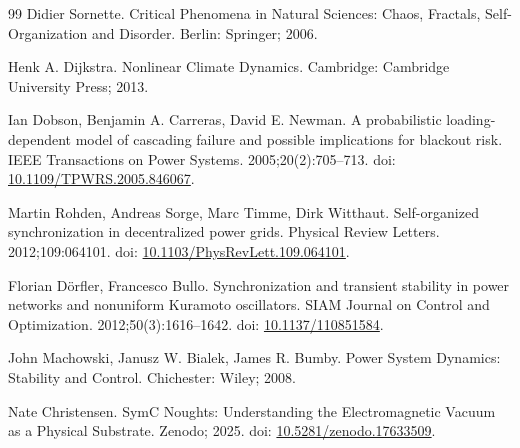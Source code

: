 \documentclass[11pt,letterpaper]{article}
\begin{document}
\begin{thebibliography}{99}
\bibitem{} Didier Sornette. Critical Phenomena in Natural Sciences: Chaos, Fractals, Self-Organization and Disorder. Berlin: Springer; 2006.

\bibitem{} Henk A. Dijkstra. Nonlinear Climate Dynamics. Cambridge: Cambridge University Press; 2013.

\bibitem{} Ian Dobson, Benjamin A. Carreras, David E. Newman. A probabilistic loading-dependent model of cascading failure and possible implications for blackout risk. IEEE Transactions on Power Systems. 2005;20(2):705--713. doi: \href{https://doi.org/10.1109/TPWRS.2005.846067}{10.1109/TPWRS.2005.846067}.

\bibitem{} Martin Rohden, Andreas Sorge, Marc Timme, Dirk Witthaut. Self-organized synchronization in decentralized power grids. Physical Review Letters. 2012;109:064101. doi: \href{https://doi.org/10.1103/PhysRevLett.109.064101}{10.1103/PhysRevLett.109.064101}.

\bibitem{} Florian Dörfler, Francesco Bullo. Synchronization and transient stability in power networks and nonuniform Kuramoto oscillators. SIAM Journal on Control and Optimization. 2012;50(3):1616--1642. doi: \href{https://doi.org/10.1137/110851584}{10.1137/110851584}.

\bibitem{} John Machowski, Janusz W. Bialek, James R. Bumby. Power System Dynamics: Stability and Control. Chichester: Wiley; 2008.

\bibitem{} Nate Christensen. SymC Noughts: Understanding the Electromagnetic Vacuum as a Physical Substrate. Zenodo; 2025. doi: \href{https://doi.org/10.5281/zenodo.17633509}{10.5281/zenodo.17633509}.

\end{thebibliography}
\end{document}
